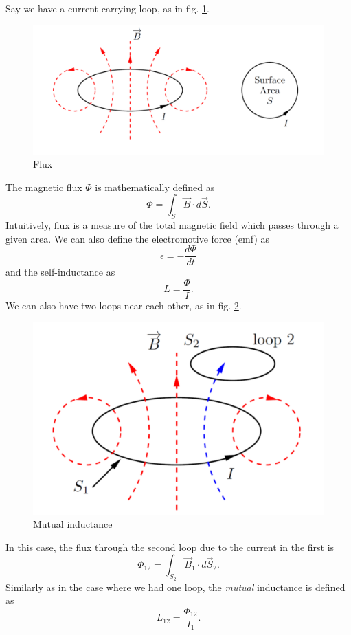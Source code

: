 \documentclass[nobib]{tufte-handout}
\begin{document}
Say we have a current-carrying loop, as in fig. \ref{fig:loop}. 
\begin{figure}
    \center 
    \caption{Flux}
    \label{fig:loop}
    \includegraphics{images/Screenshot 2023-10-25 113639.png}
\end{figure}
The magnetic flux $\Phi$ is mathematically defined as 
\[\Phi = \int_{S} \vec{B} \cdot d\vec{S}.\]
Intuitively, flux is a measure of the total magnetic 
field which passes through a given area. 
We can also define the electromotive force (emf) as 
\[\epsilon = -\frac{d \Phi}{dt}\]
and the self-inductance as 
\[L = \frac{\Phi}{I}.\]
We can also have two loops near each other, as in fig. \ref{fig:mutual}.
\begin{figure}
    \center 
    \caption{Mutual inductance}
    \label{fig:mutual}
    \includegraphics{images/mutualinductance.png}
\end{figure}
In this case, the flux through the second loop 
due to the current in the first is 
\[\Phi_{12} = \int_{S_2} \vec{B}_1 \cdot d\vec{S}_2.\]
Similarly as in the case where we had one loop, the 
\emph{mutual} inductance is defined as 
\[L_{12} = \frac{\Phi_{12}}{I_1}.\]
\end{document}
